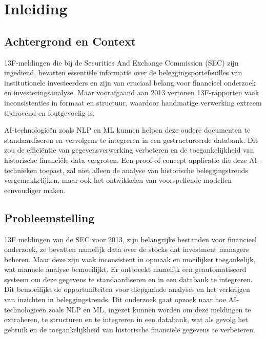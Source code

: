 


% 

\section{Inleiding}
\label{sec:inleiding}
\subsection{Achtergrond en Context}

13F-meldingen die bij de Securities And Exchange Commission (SEC) zijn ingediend, bevatten essentiële informatie over de beleggingsportefeuilles van institutionele investeerders en zijn van cruciaal belang voor financieel onderzoek en investeringsanalyse. Maar voorafgaand aan 2013 vertonen 13F-rapporten vaak inconsistenties in formaat en structuur, waardoor handmatige verwerking extreem tijdrovend en foutgevoelig is. 

AI-technologieën zoals NLP en ML kunnen helpen deze oudere documenten te standaardiseren en vervolgens te integreren in een gestructureerde databank. Dit zou de efficiëntie van gegevensverwerking verbeteren en de toegankelijkheid van historische financiële data vergroten. Een proof-of-concept applicatie die deze AI-technieken toepast, zal niet alleen de analyse van historische beleggingstrends vergemakkelijken, maar ook het ontwikkelen van voorspellende modellen eenvoudiger maken.

\subsection{Probleemstelling}

13F meldingen van de SEC voor 2013, zijn belangrijke bestanden voor financieel onderzoek, ze bevatten namelijk data over de stocks dat investment managers beheren. Maar deze zijn vaak inconsistent in opmaak en moeilijker toegankelijk, wat manuele analyse bemoeilijkt. Er ontbreekt namelijk een geautomatiseerd systeem om deze gegevens te standaardiseren en in een databank te integreren. Dit bemoeilijkt de opportuniteiten voor diepgaande analyses en het verkrijgen van inzichten in beleggingstrends. Dit onderzoek gaat opzoek naar hoe AI-technologieën zoals NLP en ML, ingezet kunnen worden om deze meldingen te extraheren, te structuren en te integreren in een databank, wat als gevolg het gebruik en de toegankelijkheid van historische financiële gegevens te verbeteren.

